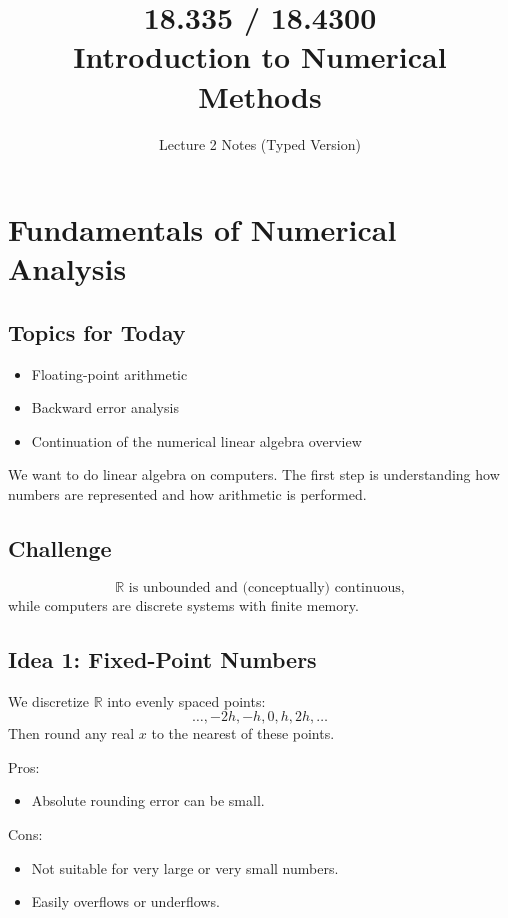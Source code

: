 \documentclass[12pt]{article}
\begin{document}
\title{18.335 / 18.4300 \\ Introduction to Numerical Methods}
\author{Lecture 2 Notes (Typed Version)}
\date{}
\maketitle

\section*{Fundamentals of Numerical Analysis}

\subsection*{Topics for Today}
\begin{itemize}
    \item Floating-point arithmetic
    \item Backward error analysis
    \item Continuation of the numerical linear algebra overview
\end{itemize}

We want to do linear algebra on computers. The first step is understanding how numbers are represented and how arithmetic is performed.

\subsection*{Challenge}
\[
\mathbb{R} \text{ is unbounded and (conceptually) continuous,}
\]
while computers are discrete systems with finite memory.

\subsection*{Idea 1: Fixed-Point Numbers}
We discretize $\mathbb{R}$ into evenly spaced points:
\[
\ldots, -2h, -h, 0, h, 2h, \ldots
\]
Then round any real $x$ to the nearest of these points. 

\noindent
Pros:
\begin{itemize}
    \item Absolute rounding error can be small.
\end{itemize}

\noindent
Cons:
\begin{itemize}
    \item Not suitable for very large or very small numbers.
    \item Easily overflows or underflows.
\end{itemize}
\end{document}
